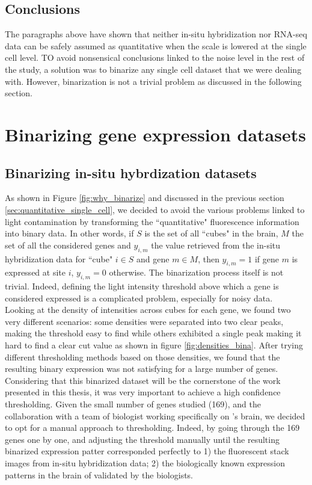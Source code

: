 	\subsection{Conclusions}
	The paragraphs above have shown that neither in-situ hybridization nor RNA-seq data can be safely assumed as quantitative when the scale is lowered at the single cell level. TO avoid nonsensical conclusions linked to the noise level in the rest of the study, a solution was to binarize any single cell dataset that we were dealing with. However, binarization is not a trivial problem as discussed in the following section.



\section{Binarizing gene expression datasets}\label{sec:binarizing}
  \subsection{Binarizing in-situ hybrdization datasets}
	As shown in Figure \ref{fig:why_binarize} and discussed in the previous section \ref{sec:quantitative_single_cell}, we decided to avoid the various problems linked to light contamination by transforming the ``quantitative" fluorescence information into binary data. In other words, if $S$ is the set of all ``cubes" in the brain, $M$ the set of all the considered genes and $y_{i,m}$ the value retrieved from the in-situ hybridization data for ``cube" $i \in S$ and gene $m \in M$, then  $y_{i,m} = 1$ if gene $m$ is expressed at site $i$, $y_{i,m} = 0$ otherwise. The binarization process itself is not trivial. Indeed, defining the light intensity threshold above which a gene is considered expressed is a complicated problem, especially for noisy data.\\

	Looking at the density of intensities across cubes for each gene, we found two very different scenarios: some densities were separated into two clear peaks, making the threshold easy to find while others exhibited a single peak making it hard to find a clear cut value as shown in figure \ref{fig:densities_bina}. After trying different thresholding methods based on those densities, we found that the resulting binary expression was not satisfying for a large number of genes. Considering that this binarized dataset will be the cornerstone of the work presented in this thesis, it was very important to achieve a high confidence thresholding. Given the small number of genes studied (169), and the collaboration with a team of biologist working specifically on \platyfull{}'s brain, we decided to opt for a manual approach to thresholding. Indeed, by going through the 169 genes one by one, and adjusting the threshold manually until the resulting binarized expression patter corresponded perfectly to 1) the fluorescent stack images from in-situ hybridization data; 2) the biologically known expression patterns in the brain of \platy{} validated by the biologists.\\
	
